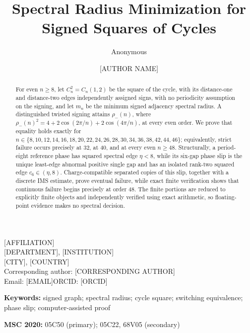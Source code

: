 \title{Spectral Radius Minimization for Signed Squares of Cycles}
\ifdefined\TargetAAnonymous
  \author{Anonymous}
\else
  \author{[AUTHOR NAME]}
\fi
\date{}
\maketitle

\ifdefined\TargetAAnonymous\else
\begin{center}
\small
\mbox{[AFFILIATION]}\\
\mbox{[DEPARTMENT]}, \mbox{[INSTITUTION]}\\
\mbox{[CITY]}, \mbox{[COUNTRY]}\\[3pt]
Corresponding author: [CORRESPONDING AUTHOR]\\
Email: [EMAIL]\quad ORCID: [ORCID]
\end{center}
\fi

\begin{abstract}
For even \(n\geq 8\), let \(C_n^2=C_n(1,2)\) be the square of the cycle,
with its distance-one and distance-two edges independently assigned signs,
with no periodicity assumption on the signing, and let \(m_n\) be the minimum
signed adjacency spectral radius.  A
distinguished twisted signing attains \(\rho_-(n)\), where
\(\rho_-(n)^2=4+2\cos(2\pi/n)+2\cos(4\pi/n)\), at every even order.  We prove
that equality holds exactly for
\(n\in\{8,10,12,14,16,18,20,22,24,26,28,30,34,36,38,42,44,46\}\); equivalently,
strict failure occurs precisely at \(32\), at \(40\), and at every even
\(n\geq48\).  Structurally, a period-eight reference phase has squared
spectral edge \(\eta<8\), while its six-gap phase slip is the unique
least-edge abnormal positive single gap and has an isolated rank-two squared
edge \(c_6\in(\eta,8)\).  Charge-compatible separated copies of this slip,
together with a discrete IMS estimate, prove eventual failure, while exact
finite verification shows that continuous failure begins precisely at order
\(48\).  The finite portions are reduced to explicitly finite objects and
independently verified using exact arithmetic, so floating-point evidence
makes no spectral decision.
\end{abstract}

\noindent\textbf{Keywords:} signed graph; spectral radius; cycle square;
switching equivalence; phase slip; computer-assisted proof

\medskip
\noindent\textbf{MSC 2020:} 05C50 (primary); 05C22, 68V05 (secondary)
